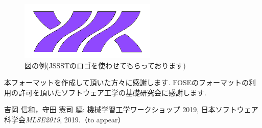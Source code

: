 \documentclass{mlse2019}           %
\begin{document}
\begin{figure}[htbp]
  \centering
  \includegraphics{jssstlogo-blue.png}
  \caption{図の例(JSSSTのロゴを使わせてもらっております)}
  \label{fig:example}
\end{figure}


\acknowledgements{}
本フォーマットを作成して頂いた方々に感謝します.
FOSEのフォーマットの利用の許可を頂いたソフトウェア工学の基礎研究会に感謝します.

%


\begin{thebibliography}{9}
 吉岡 信和，守田 憲司 編: 機械学習工学ワークショップ 2019,
         日本ソフトウェア科学会{\em MLSE2019},  2019.（to appear）
\end{thebibliography}
\end{document}
